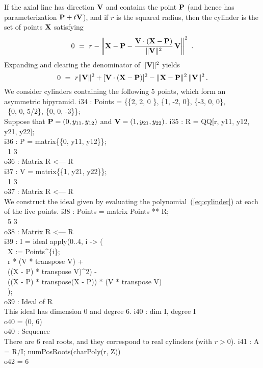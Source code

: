 If the axial line has direction ${\bf V}$ and contains the point ${\bf P}$
(and hence has parameterization ${\bf P}+t{\bf V}$), and if $r$ is the squared
radius, then the cylinder is the set of points ${\bf X}$
satisfying 
$$
  0 \ =\ r - 
  \left\| {\bf X} - {\bf P} - \frac{{\bf V}\cdot({\bf X} - {\bf P})}%
     {\|{\bf V}\|^2}\,{\bf V} \right\|^2\ .
$$
Expanding and clearing the denominator of $\|{\bf V}\|^2$ yields
%
\begin{equation}\label{eq:cylinder}
  0 \ =\ r \|{\bf V}\|^2 + 
         [{\bf V}\cdot({\bf X} - {\bf P})]^2 - 
        \|{\bf X} - {\bf P}\|^2\, \|{\bf V}\|^2\,.
\end{equation}
%
We consider cylinders containing the following 5 points, which form an
asymmetric bipyramid.
%
\beginOutput
i34 : Points = \{\{2, 2,  0 \}, \{1, -2,  0\}, \{-3, 0, 0\}, \\
\                \{0, 0, 5/2\}, \{0,  0, -3\}\};\\
\endOutput
%
Suppose that ${\bf P}=(0,y_{11},y_{12})$ and ${\bf V}=(1,y_{21},y_{22})$.
%
\beginOutput
i35 : R = QQ[r, y11, y12, y21, y22];\\
\endOutput
%
\beginOutput
i36 : P = matrix\{\{0, y11, y12\}\};\\
\emptyLine
\              1       3\\
o36 : Matrix R  <--- R\\
\endOutput
%
\beginOutput
i37 : V = matrix\{\{1, y21, y22\}\};\\
\emptyLine
\              1       3\\
o37 : Matrix R  <--- R\\
\endOutput
%
We construct the ideal given by evaluating the
polynomial~(\ref{eq:cylinder}) at each of the five points.
%
\beginOutput
i38 : Points = matrix Points ** R;\\
\emptyLine
\              5       3\\
o38 : Matrix R  <--- R\\
\endOutput
%
%
\beginOutput
i39 : I = ideal apply(0..4, i -> (\\
\                X := Points^\{i\};\\
\                r * (V * transpose V)  +\\
\                 ((X - P) * transpose V)^2) -\\
\                 ((X - P) * transpose(X - P)) * (V * transpose V)\\
\                );\\
\emptyLine
o39 : Ideal of R\\
\endOutput
%
This ideal has dimension 0 and degree 6.
%
\beginOutput
i40 : dim I, degree I\\
\emptyLine
o40 = (0, 6)\\
\emptyLine
o40 : Sequence\\
\endOutput
%
There are 6 real roots, and they correspond to real cylinders (with $r>0$).
%
\beginOutput
i41 : A = R/I; numPosRoots(charPoly(r, Z))\\
\emptyLine
o42 = 6\\
\endOutput
%

